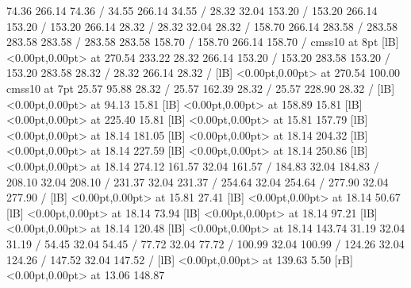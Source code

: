 {\setdashpattern <4pt, 4pt>
 74.36 266.14 74.36 /
\setdashpattern <4pt, 4pt>
 34.55 266.14 34.55 /
\setsolid
{} 28.32 32.04 153.20 /
 153.20 266.14 153.20 /
 153.20 266.14 28.32 /
 28.32 32.04 28.32 /
\setsolid
{} 158.70 266.14 283.58 /
 283.58 283.58 283.58 /
 283.58 283.58 158.70 /
 158.70 266.14 158.70 /
\font\picfont cmss10 at 8pt\picfont
{}  [lB] <0.00pt,0.00pt> at 270.54 233.22
\setsolid
{} 28.32 266.14 153.20 /
 153.20 283.58 153.20 /
 153.20 283.58 28.32 /
 28.32 266.14 28.32 /
  [lB] <0.00pt,0.00pt> at 270.54 100.00
\font\picfont cmss10 at 7pt\picfont
\setsolid
{} 25.57 95.88 28.32 /
\setsolid
{} 25.57 162.39 28.32 /
\setsolid
{} 25.57 228.90 28.32 /
  [lB] <0.00pt,0.00pt> at 94.13 15.81
  [lB] <0.00pt,0.00pt> at 158.89 15.81
  [lB] <0.00pt,0.00pt> at 225.40 15.81
  [lB] <0.00pt,0.00pt> at 15.81 157.79
  [lB] <0.00pt,0.00pt> at 18.14 181.05
  [lB] <0.00pt,0.00pt> at 18.14 204.32
  [lB] <0.00pt,0.00pt> at 18.14 227.59
  [lB] <0.00pt,0.00pt> at 18.14 250.86
  [lB] <0.00pt,0.00pt> at 18.14 274.12
\setsolid
{} 161.57 32.04 161.57 /
\setsolid
{} 184.83 32.04 184.83 /
\setsolid
{} 208.10 32.04 208.10 /
\setsolid
{} 231.37 32.04 231.37 /
\setsolid
{} 254.64 32.04 254.64 /
\setsolid
{} 277.90 32.04 277.90 /
  [lB] <0.00pt,0.00pt> at 15.81 27.41
  [lB] <0.00pt,0.00pt> at 18.14 50.67
  [lB] <0.00pt,0.00pt> at 18.14 73.94
  [lB] <0.00pt,0.00pt> at 18.14 97.21
  [lB] <0.00pt,0.00pt> at 18.14 120.48
  [lB] <0.00pt,0.00pt> at 18.14 143.74
\setsolid
{} 31.19 32.04 31.19 /
\setsolid
{} 54.45 32.04 54.45 /
\setsolid
{} 77.72 32.04 77.72 /
\setsolid
{} 100.99 32.04 100.99 /
\setsolid
{} 124.26 32.04 124.26 /
\setsolid
{} 147.52 32.04 147.52 /
  [lB] <0.00pt,0.00pt> at 139.63 5.50
 [rB] <0.00pt,0.00pt> at 13.06 148.87
\endpicture
}
